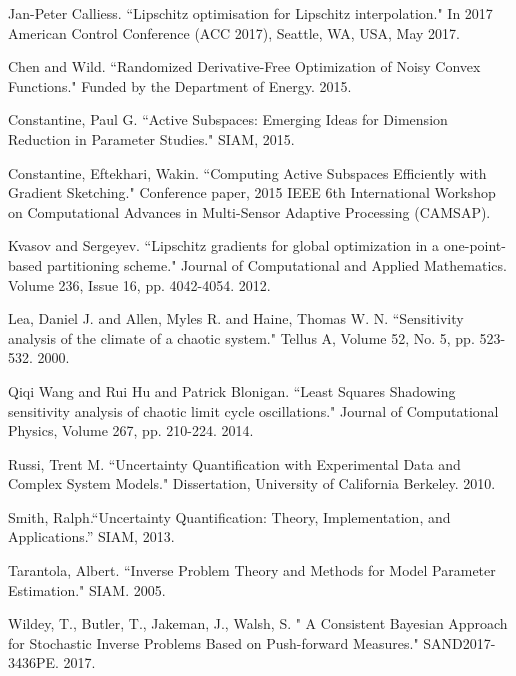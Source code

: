 \documentclass{amsart}
\begin{document}
\begin{thebibliography}{65}





 Jan-Peter Calliess. ``Lipschitz optimisation for Lipschitz interpolation." In 2017 American Control Conference (ACC 2017), Seattle, WA, USA, May 2017.

 Chen and Wild. ``Randomized Derivative-Free Optimization of Noisy Convex Functions." Funded by the Department of Energy. 2015.

 Constantine, Paul G. ``Active Subspaces: Emerging Ideas for Dimension Reduction in Parameter Studies." SIAM, 2015.

 Constantine, Eftekhari, Wakin. ``Computing Active Subspaces Efficiently with Gradient Sketching." Conference paper, 2015 IEEE 6th International Workshop on Computational Advances in Multi-Sensor Adaptive Processing (CAMSAP).


 Kvasov and Sergeyev. ``Lipschitz gradients for global optimization in a one-point-based partitioning scheme." Journal of Computational and Applied Mathematics. Volume 236, Issue 16, pp. 4042-4054. 2012.

 Lea, Daniel J. and Allen, Myles R. and Haine, Thomas W. N. ``Sensitivity analysis of the climate of a chaotic system." Tellus A, Volume 52, No. 5, pp. 523-532. 2000.


 Qiqi Wang and Rui Hu and Patrick Blonigan. ``Least Squares Shadowing sensitivity analysis of chaotic limit cycle oscillations." Journal of Computational Physics, Volume 267, pp. 210-224. 2014.

 Russi, Trent M. ``Uncertainty Quantification with Experimental Data and Complex System Models." Dissertation, University of California Berkeley. 2010.

  Smith, Ralph.``Uncertainty Quantification: Theory, Implementation, and Applications.” SIAM, 2013.


 Tarantola, Albert. ``Inverse Problem Theory and Methods for Model Parameter Estimation." SIAM. 2005.



 Wildey, T., Butler, T., Jakeman, J., Walsh, S. " A Consistent Bayesian Approach for Stochastic Inverse Problems Based on Push-forward Measures." SAND2017-3436PE. 2017.


\end{thebibliography}
\end{document}

